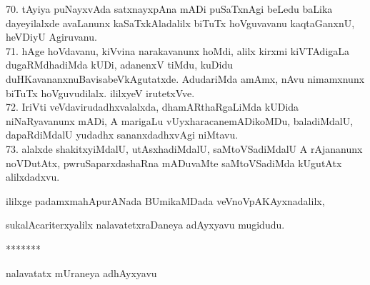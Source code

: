 \documentclass{article}
\begin{document}
70. tAyiya puNayxvAda satxnayxpAna mADi puSaTxnAgi beLedu baLika dayeyilalxde avaLanunx kaSaTxkAladalilx biTuTx hoVguvavanu kaqtaGanxnU, heVDiyU Agiruvanu.\\
71. hAge hoVdavanu, kiVvina narakavanunx hoMdi, alilx kirxmi kiVTAdigaLa dugaRMdhadiMda kUDi, adanenxV tiMdu, kuDidu duHKavananxnuBavisabeVkAgutatxde. AdudariMda amAmx, nAvu nimamxnunx biTuTx hoVguvudilalx. ililxyeV irutetxVve.\\
72. IriVti veVdavirudadhxvalalxda, dhamARthaRgaLiMda kUDida niNaRyavanunx mADi, A marigaLu vUyxharacanemADikoMDu, baladiMdalU, dapaRdiMdalU yudadhx sananxdadhxvAgi niMtavu.\\
73. alalxde shakitxyiMdalU, utAsxhadiMdalU, saMtoVSadiMdalU A rAjananunx noVDutAtx, pwruSaparxdashaRna mADuvaMte saMtoVSadiMda kUgutAtx alilxdadxvu.\\

\begin{center}
ililxge padamxmahApurANada BUmikaMDada veVnoVpAKAyxnadalilx,
\end{center}

\begin{center}
sukalAcariterxyalilx nalavatetxraDaneya adAyxyavu mugidudu.
\end{center}

\begin{center}
*******
\end{center}

\begin{center}
nalavatatx mUraneya adhAyxyavu
\end{center}
\end{document}
